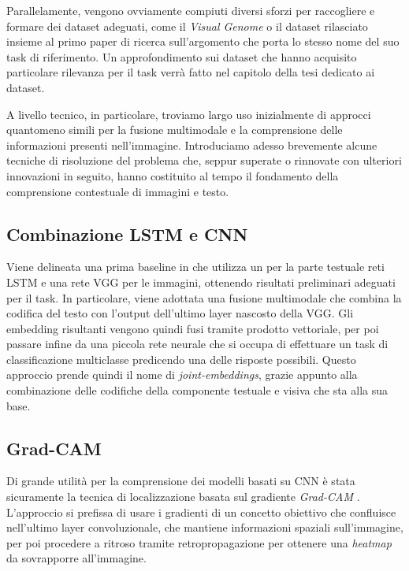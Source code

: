 \documentclass[../main.tex]{subfiles}
\begin{document}
Parallelamente, vengono ovviamente compiuti diversi sforzi per raccogliere e formare dei dataset adeguati, come il \textit{Visual Genome} \cite{DBLP:journals/corr/KrishnaZGJHKCKL16} o il dataset rilasciato insieme al primo paper di ricerca sull'argomento \cite{DBLP:journals/corr/AntolALMBZP15} che porta lo stesso nome del suo task di riferimento. Un approfondimento sui dataset che hanno acquisito particolare rilevanza per il task verrà fatto nel capitolo della tesi dedicato ai dataset.

A livello tecnico, in particolare, troviamo largo uso inizialmente di approcci quantomeno simili per la fusione multimodale e la comprensione delle informazioni presenti nell'immagine.
Introduciamo adesso brevemente alcune tecniche di risoluzione del problema che, seppur superate o rinnovate con ulteriori innovazioni in seguito, hanno costituito al tempo il fondamento della comprensione contestuale di immagini e testo. 

\subsection{Combinazione LSTM e CNN}

Viene delineata una prima baseline in \cite{DBLP:journals/corr/AntolALMBZP15} che utilizza un  per la parte testuale reti LSTM e una rete VGG \cite{simonyan2015vgg} per le immagini, ottenendo risultati preliminari adeguati per il task.
In particolare, viene adottata una fusione multimodale che combina la codifica del testo con l'output dell'ultimo layer nascosto della VGG. 
Gli embedding risultanti vengono quindi fusi tramite prodotto vettoriale, per poi passare infine da una piccola rete neurale che si occupa di effettuare un task di classificazione multiclasse predicendo una delle risposte possibili.
Questo approccio prende quindi il nome di \textit{joint-embeddings}, grazie appunto alla combinazione delle codifiche della componente testuale e visiva che sta alla sua base.

\subsection{Grad-CAM}

Di grande utilità per la comprensione dei modelli basati su CNN è stata sicuramente la tecnica di localizzazione basata sul gradiente \textit{Grad-CAM} \cite{DBLP:journals/corr/SelvarajuDVCPB16}. 
L'approccio si prefissa di usare i gradienti di un concetto obiettivo che confluisce nell'ultimo layer convoluzionale, che mantiene informazioni spaziali sull'immagine, per poi procedere a ritroso tramite retropropagazione per ottenere una \textit{heatmap} da sovrapporre all'immagine.
\end{document}
